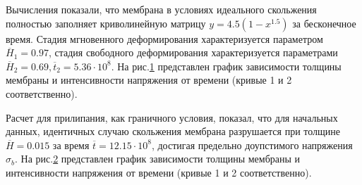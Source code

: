    Вычисления показали, что мембрана в условиях идеального скольжения полностью заполняет криволинейную матрицу $y=4.5(1-x^{1.5})$ за бесконечное время. 
   Стадия мгновенного деформирования характеризуется параметром $\overline{H}_1 = 0.97$, 
   стадия свободного деформирования характеризуется параметрами $\overline{H}_2 = 0.69, \overline{t}_2 = 5.36 \cdot 10^8$.
   На рис.\ref{quad_sliging} представлен график зависимости толщины мембраны и интенсивности напряжения от времени
   (кривые 1 и 2 соответственно).
   
   		\begin{figure}[h!]	
				\def\svgwidth{\columnwidth}
				\caption{} 
				\label{quad_sliging}
		\end{figure}

Расчет для прилипания, как граничного условия,	показал, что для начальных данных, идентичных случаю скольжения 
	мембрана разрушается при толщине $\overline{H}=0.015$ за время $\overline{t}=12.15\cdot 10^8$, достигая предельно доупстимого напряжения $\sigma_b$.    На рис.\ref{quad_sticking} представлен график зависимости толщины мембраны и интенсивности напряжения от времени (кривые 1 и 2 соответственно).
   
		\begin{figure}[h!]	
				\def\svgwidth{\columnwidth}
				\caption{} 
				\label{quad_sticking}
		\end{figure}

